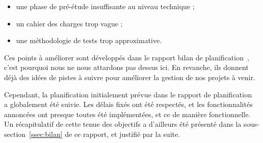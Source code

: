 \begin{itemize}
\item une phase de pré-étude insuffisante au niveau technique ;
\item un cahier des charges trop vague ;
\item une méthodologie de tests trop approximative.
\end{itemize}

Ces points à améliorer sont développés dans le rapport bilan de planification~\cite{bilanPlanif}, c'est pourquoi nous ne nous attardons pas dessus ici. En revanche, ils donnent déjà des idées de pistes à suivre pour améliorer la gestion de nos projets à venir.

Cependant, la planification initialement prévue dans le rapport de planification~\cite{planif} a globalement été suivie. Les délais fixés ont été respectés, et les fonctionnalités annoncées ont presque toutes été implémentées, et ce  de manière fonctionnelle. Un récapitulatif de cette tenue des objectifs a d'ailleurs été présenté dans la {\sc sous-section}~\ref{ssec:bilan} de ce rapport, et justifié par la suite. 